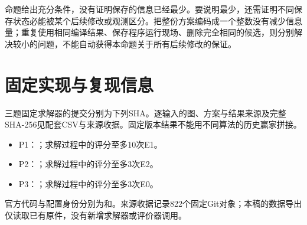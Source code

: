 \documentclass[anonymous,notoc]{gmcm2026}
\begin{document}
命题给出充分条件，没有证明保存的信息已经最少。要说明最少，还需证明不同保存状态必能被某个后续修改或观测区分。把整份方案编码成一个整数没有减少信息量；重复使用相同编译结果、保存程序运行现场、删除完全相同的候选，则分别解决较小的问题，不能自动获得本命题关于所有后续修改的保证。

\section{固定实现与复现信息}
三题固定求解器的提交分别为下列SHA。逐输入的图、方案与结果来源及完整SHA-256见配套CSV与来源收据。固定版本结果不能用不同算法的历史赢家拼接。
\begin{itemize}
\item P1：\texttt{}；求解过程中的评分至多10次E1。
\item P2：\texttt{}；求解过程中的评分至多3次E2。
\item P3：\texttt{}；求解过程中的评分至多3次E0。
\end{itemize}
官方代码与配置身份分别为\texttt{}和\texttt{}。来源收据记录822个固定Git对象；本稿的数据导出仅读取已有原件，没有新增求解器或评价器调用。
\end{document}
